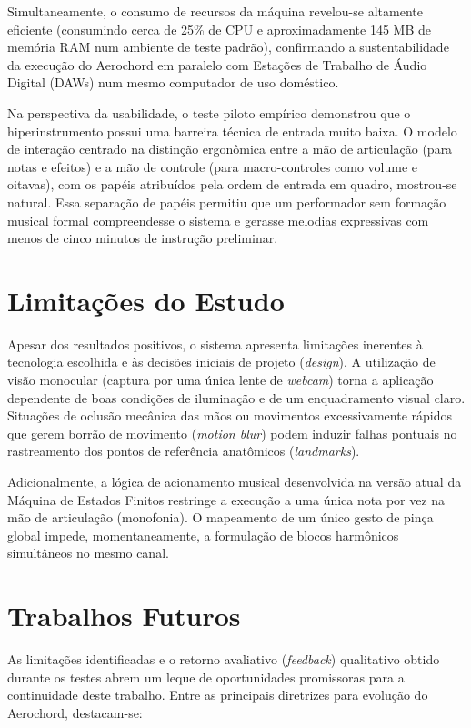 Simultaneamente, o consumo de recursos da máquina revelou-se altamente eficiente (consumindo cerca de 25\% de CPU e aproximadamente 145 MB de memória RAM num ambiente de teste padrão), confirmando a sustentabilidade da execução do Aerochord em paralelo com Estações de Trabalho de Áudio Digital (DAWs) num mesmo computador de uso doméstico. 

Na perspectiva da usabilidade, o teste piloto empírico demonstrou que o hiperinstrumento possui uma barreira técnica de entrada muito baixa. O modelo de interação centrado na distinção ergonômica entre a mão de articulação (para notas e efeitos) e a mão de controle (para macro-controles como volume e oitavas), com os papéis atribuídos pela ordem de entrada em quadro, mostrou-se natural. Essa separação de papéis permitiu que um performador sem formação musical formal compreendesse o sistema e gerasse melodias expressivas com menos de cinco minutos de instrução preliminar.

\section{Limitações do Estudo}
\label{sec:limitacoes}

Apesar dos resultados positivos, o sistema apresenta limitações inerentes à tecnologia escolhida e às decisões iniciais de projeto (\textit{design}). A utilização de visão monocular (captura por uma única lente de \textit{webcam}) torna a aplicação dependente de boas condições de iluminação e de um enquadramento visual claro. Situações de oclusão mecânica das mãos ou movimentos excessivamente rápidos que gerem borrão de movimento (\textit{motion blur}) podem induzir falhas pontuais no rastreamento dos pontos de referência anatômicos (\textit{landmarks}).

Adicionalmente, a lógica de acionamento musical desenvolvida na versão atual da Máquina de Estados Finitos restringe a execução a uma única nota por vez na mão de articulação (monofonia). O mapeamento de um único gesto de pinça global impede, momentaneamente, a formulação de blocos harmônicos simultâneos no mesmo canal.

\section{Trabalhos Futuros}
\label{sec:trabalhos_futuros}

As limitações identificadas e o retorno avaliativo (\textit{feedback}) qualitativo obtido durante os testes abrem um leque de oportunidades promissoras para a continuidade deste trabalho. Entre as principais diretrizes para evolução do Aerochord, destacam-se:

